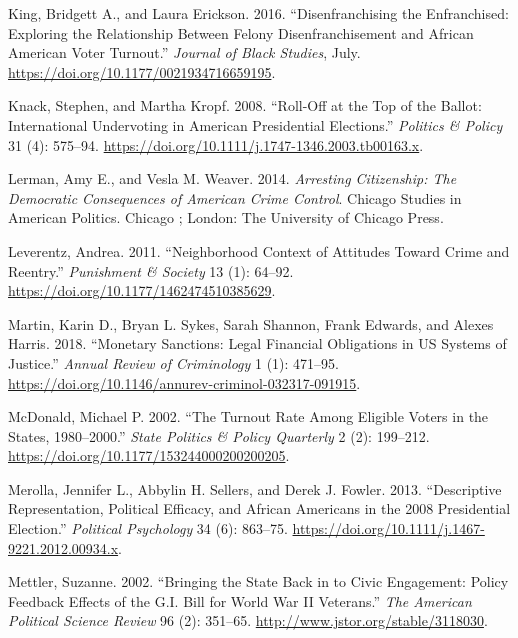\documentclass[
  12pt,
]{article}
\newlength{\cslhangindent}
\newenvironment{cslreferences}%
  {\setlength{\parindent}{0pt}%
  \everypar{\setlength{\hangindent}{\cslhangindent}}\ignorespaces}%
  {\par}
\begin{document}
\begin{cslreferences}
\leavevmode\hypertarget{ref-King2016}{}%
King, Bridgett A., and Laura Erickson. 2016. ``Disenfranchising the Enfranchised: Exploring the Relationship Between Felony Disenfranchisement and African American Voter Turnout.'' \emph{Journal of Black Studies}, July. \url{https://doi.org/10.1177/0021934716659195}.

\leavevmode\hypertarget{ref-Knack2008}{}%
Knack, Stephen, and Martha Kropf. 2008. ``Roll-Off at the Top of the Ballot: International Undervoting in American Presidential Elections.'' \emph{Politics \& Policy} 31 (4): 575--94. \url{https://doi.org/10.1111/j.1747-1346.2003.tb00163.x}.

\leavevmode\hypertarget{ref-Lerman2014}{}%
Lerman, Amy E., and Vesla M. Weaver. 2014. \emph{Arresting Citizenship: The Democratic Consequences of American Crime Control}. Chicago Studies in American Politics. Chicago ; London: The University of Chicago Press.

\leavevmode\hypertarget{ref-Leverentz2011}{}%
Leverentz, Andrea. 2011. ``Neighborhood Context of Attitudes Toward Crime and Reentry.'' \emph{Punishment \& Society} 13 (1): 64--92. \url{https://doi.org/10.1177/1462474510385629}.

\leavevmode\hypertarget{ref-Martin2018}{}%
Martin, Karin D., Bryan L. Sykes, Sarah Shannon, Frank Edwards, and Alexes Harris. 2018. ``Monetary Sanctions: Legal Financial Obligations in US Systems of Justice.'' \emph{Annual Review of Criminology} 1 (1): 471--95. \url{https://doi.org/10.1146/annurev-criminol-032317-091915}.

\leavevmode\hypertarget{ref-McDonald2002}{}%
McDonald, Michael P. 2002. ``The Turnout Rate Among Eligible Voters in the States, 1980--2000.'' \emph{State Politics \& Policy Quarterly} 2 (2): 199--212. \url{https://doi.org/10.1177/153244000200200205}.

\leavevmode\hypertarget{ref-Merolla2013}{}%
Merolla, Jennifer L., Abbylin H. Sellers, and Derek J. Fowler. 2013. ``Descriptive Representation, Political Efficacy, and African Americans in the 2008 Presidential Election.'' \emph{Political Psychology} 34 (6): 863--75. \url{https://doi.org/10.1111/j.1467-9221.2012.00934.x}.

\leavevmode\hypertarget{ref-Mettler2002}{}%
Mettler, Suzanne. 2002. ``Bringing the State Back in to Civic Engagement: Policy Feedback Effects of the G.I. Bill for World War II Veterans.'' \emph{The American Political Science Review} 96 (2): 351--65. \url{http://www.jstor.org/stable/3118030}.


\end{cslreferences}
\end{document}
